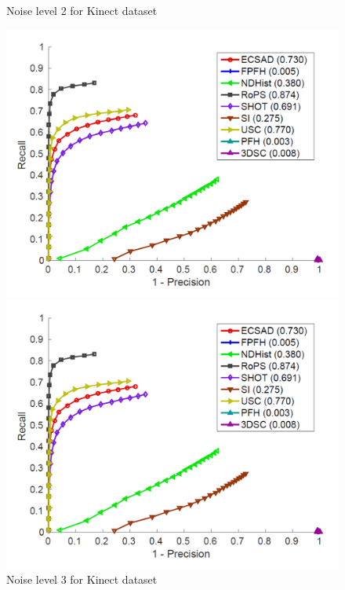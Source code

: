 \documentclass[10pt,twocolumn,letterpaper]{article}
\begin{document}
\begin{figure}[htp]
\begin{minipage}[b]{.3\textwidth}
\caption{Noise level 2 for Kinect dataset}\label{fig:kinect_n2}
\end{minipage}
\begin{minipage}[b]{.3\textwidth}
\includegraphics[width=1.0\linewidth, height= 1.0\linewidth, keepaspectratio]{img/PRC_1.pdf}
\caption{Noise level 3 for Kinect dataset}\label{fig:kinect_n3}
\end{minipage}
\begin{minipage}[b]{.3\textwidth}
\includegraphics[width=1.0\linewidth, height= 1.0\linewidth, keepaspectratio]{img/PRC_1.pdf} 

\end{minipage}
\end{figure}
\end{document}
